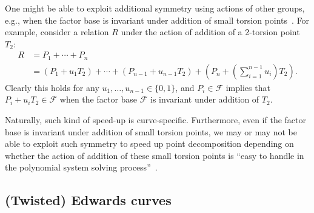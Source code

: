One might be able to exploit additional symmetry using actions of
other groups, e.g., when the factor base is invariant under addition
of small torsion points~\cite{DBLP:journals/joc/FaugereGHR14}.
%
For example, consider a relation $R$ under the action of addition of a
2-torsion point $T_2$:
\begin{align*}
  R & = P_1+\cdots+P_n \\
    & =
      (P_1+u_1T_2)+\cdots+(P_{n-1}+u_{n-1}T_2)+\left(P_n+\left(\sum_{i=1}^{n-1}u_i\right)T_2\right).
\end{align*}
%
Clearly this holds for any $u_1,\ldots,u_{n-1}\in\{0,1\}$, and
$P_i\in\mathcal F$ implies that $P_i+u_iT_2\in\mathcal F$ when the
factor base $\mathcal F$ is invariant under addition of $T_2$.

Naturally, such kind of speed-up is curve-specific.
%
Furthermore, even if the factor base is invariant under addition of
small torsion points, we may or may not be able to exploit such
symmetry to speed up point decomposition depending on whether the
action of addition of these small torsion points is ``easy to handle
in the polynomial system solving
process''~\cite{DBLP:journals/joc/FaugereGHR14}.


\subsection{(Twisted) Edwards curves}
\label{sec:twisted-edwards}


